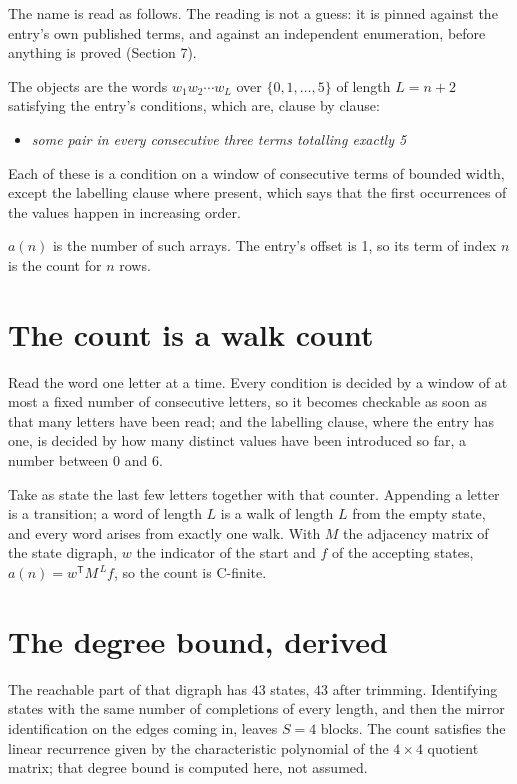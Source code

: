 \documentclass[11pt]{article}
\theoremstyle{definition}
\begin{document}
The name is read as follows. The reading is not a guess: it is pinned against the entry's own published terms, and against an independent enumeration, before anything is proved (Section 7).

The objects are the words $w_1 w_2 \cdots w_L$ over $\{0,1,\dots,5\}$ of length $L = n + 2$ satisfying the entry's conditions, which are, clause by clause:

\begin{itemize}

\item {\itshape some pair in every consecutive three terms totalling exactly 5}

\end{itemize}

Each of these is a condition on a window of consecutive terms of bounded width, except the labelling clause where present, which says that the first occurrences of the values happen in increasing order.

$a(n)$ is the number of such arrays. The entry's offset is 1, so its term of index $n$ is the count for $n$ rows.

\section{The count is a walk count}

Read the word one letter at a time. Every condition is decided by a window of at most a fixed number of consecutive letters, so it becomes checkable as soon as that many letters have been read; and the labelling clause, where the entry has one, is decided by how many distinct values have been introduced so far, a number between $0$ and 6.

Take as state the last few letters together with that counter. Appending a letter is a transition; a word of length $L$ is a walk of length $L$ from the empty state, and every word arises from exactly one walk. With $M$ the adjacency matrix of the state digraph, $w$ the indicator of the start and $f$ of the accepting states, $a(n) = w^{\mathsf T}M^{\,L}f$, so the count is C-finite.

\section{The degree bound, derived}

The reachable part of that digraph has $43$ states, $43$ after trimming. Identifying states with the same number of completions of every length, and then the mirror identification on the edges coming in, leaves $S = 4$ blocks. The count satisfies the linear recurrence given by the characteristic polynomial of the $4\times4$ quotient matrix; that degree bound is computed here, not assumed.
\end{document}
